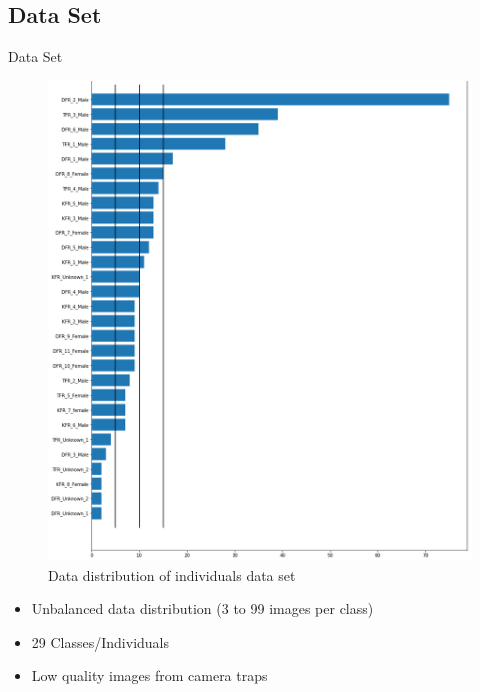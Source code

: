 \documentclass[10pt]{beamer}
\begin{document}
\subsection{Data Set}
\begin{frame}{Data Set}
	\begin{minipage}[c]{0.48\linewidth}
		\centering
		\begin{figure}
			\includegraphics[width=\linewidth,height=.8\textheight,keepaspectratio]{images/Data_dist_leo_lines_sorted_hori.png}
			\caption{Data distribution of individuals data set}
		\end{figure}
	\end{minipage}
	\hfill
	\begin{minipage}[c]{0.48\linewidth}
		\begin{itemize}
			\item Unbalanced data distribution (3 to 99 images per class)
			\item 29 Classes/Individuals
			\item Low quality images from camera traps
		\end{itemize}
	\end{minipage}
\end{frame}
\end{document}
